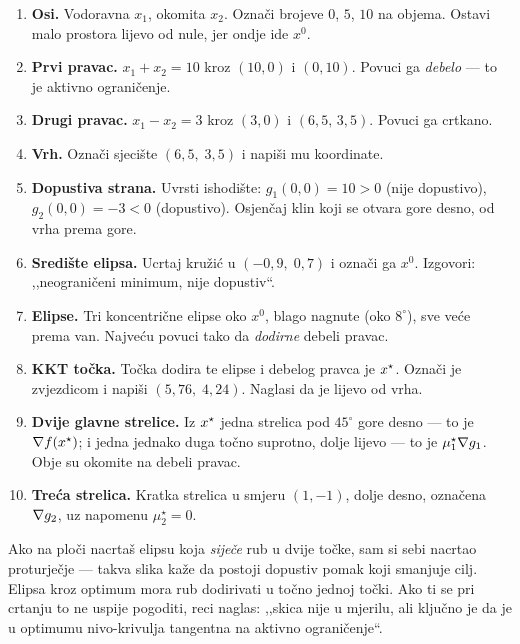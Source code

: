 \begin{ploca}
\begin{enumerate}[leftmargin=*]
  \item \textbf{Osi.} Vodoravna $x_1$, okomita $x_2$. Označi brojeve $0$, $5$,
        $10$ na objema. Ostavi malo prostora lijevo od nule, jer ondje ide $x^{0}$.
  \item \textbf{Prvi pravac.} $x_1 + x_2 = 10$ kroz $(10,0)$ i $(0,10)$. Povuci
        ga \emph{debelo} --- to je aktivno ograničenje.
  \item \textbf{Drugi pravac.} $x_1 - x_2 = 3$ kroz $(3,0)$ i $(6{,}5,\, 3{,}5)$.
        Povuci ga crtkano.
  \item \textbf{Vrh.} Označi sjecište $(6{,}5,\; 3{,}5)$ i napiši mu koordinate.
  \item \textbf{Dopustiva strana.} Uvrsti ishodište: $g_1(0,0) = 10 > 0$ (nije
        dopustivo), $g_2(0,0) = -3 < 0$ (dopustivo). Osjenčaj klin koji se otvara
        gore desno, od vrha prema gore.
  \item \textbf{Središte elipsa.} Ucrtaj kružić u $(-0{,}9,\; 0{,}7)$ i označi
        ga $x^{0}$. Izgovori: ,,neograničeni minimum, nije dopustiv``.
  \item \textbf{Elipse.} Tri koncentrične elipse oko $x^{0}$, blago nagnute
        (oko $8^\circ$), sve veće prema van. Najveću povuci tako da \emph{dodirne}
        debeli pravac.
  \item \textbf{KKT točka.} Točka dodira te elipse i debelog pravca je $x^{\star}$.
        Označi je zvjezdicom i napiši $(5{,}76,\; 4{,}24)$. Naglasi da je lijevo
        od vrha.
  \item \textbf{Dvije glavne strelice.} Iz $x^{\star}$ jedna strelica pod
        $45^\circ$ gore desno --- to je $\nabla f(x^{\star})$; i jedna jednako duga
        točno suprotno, dolje lijevo --- to je $\mu_1^{\star}\nabla g_1$. Obje su
        okomite na debeli pravac.
  \item \textbf{Treća strelica.} Kratka strelica u smjeru $(1,-1)$, dolje desno,
        označena $\nabla g_2$, uz napomenu $\mu_2^{\star} = 0$.
\end{enumerate}
\end{ploca}

\begin{zamka}
Ako na ploči nacrtaš elipsu koja \emph{siječe} rub u dvije točke, sam si sebi
nacrtao proturječje --- takva slika kaže da postoji dopustiv pomak koji smanjuje
cilj. Elipsa kroz optimum mora rub dodirivati u točno jednoj točki. Ako ti se pri
crtanju to ne uspije pogoditi, reci naglas: ,,skica nije u mjerilu, ali ključno
je da je u optimumu nivo-krivulja tangentna na aktivno ograničenje``.
\end{zamka}

